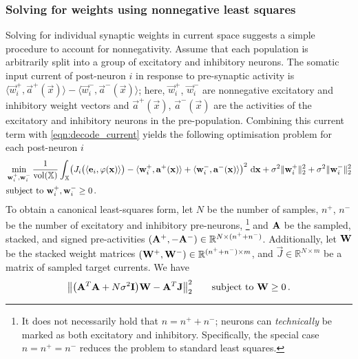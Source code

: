 \subsubsection{Solving for weights using nonnegative least squares}
Solving for individual synaptic weights in current space suggests a simple procedure to account for nonnegativity.
Assume that each population is arbitrarily split into a group of excitatory and inhibitory neurons.
The somatic input current of post-neuron $i$ in response to pre-synaptic activity is $\langle \vec w_i^+, \vec a^+(\vec x) \rangle - \langle \vec w_i^-, \vec a^-(\vec x) \rangle$;
here, $\vec w_i^+$, $\vec w_i^-$ are nonnegative excitatory and inhibitory weight vectors and $\vec a^+(\vec x)$, $\vec a^-(\vec x)$ are the activities of the excitatory and inhibitory neurons in the pre-population.
Combining this current term with \cref{eqn:decode_current} yields the following optimisation problem for each post-neuron $i$
\begin{align}
	\begin{aligned}
	& \min_{{\mathbf{w}}_i^+, {\mathbf{w}}_i^-}
	\frac{1}{\operatorname{vol}(\mathbb{X})} \int_{\mathbb{X}} \!
	\left(
		J_i\bigl(\langle \mathbf{e}_i, \varphi(\mathbf{x}) \rangle\bigr)
		- \langle \mathbf{w}_{i}^+, \mathbf{a}^+(\mathbf{x}) \rangle
		+ \langle \mathbf{w}_{i}^-, \mathbf{a}^-(\mathbf{x}) \rangle
	\right)^2 \, \mathrm{d} \mathbf{x} + \sigma^2 \|\mathbf{w}_{i}^+\|_2^2 + \sigma^2 \|\mathbf{w}_{i}^-\|_2^2 \\
	& \text{subject to } \mathbf{w}_i^+, \mathbf{w}_i^- \geq 0 \,.
	\end{aligned}
	\label{eqn:decode_nonneg}
\end{align}
To obtain a canonical least-squares form, let $N$ be the number of samples, $n^+$, $n^-$ be the number of excitatory and inhibitory pre-neurons,%
\footnote{
It does not necessarily hold that $n = n^+ + n^-$; neurons can \emph{technically} be marked as both excitatory and inhibitory. Specifically, the special case $n = n^+ = n^-$ reduces the \NNLS problem to standard least squares.
}
and $\mathbf{A}$ be the sampled, stacked, and signed pre-activities $(\mathbf{A}^+, -\mathbf{A}^-) \in \mathbb{R}^{N \times (n^+ + n^-)}$.
Additionally, let $\mathbf{W}$ be the stacked weight matrices $(\mathbf{W}^+, \mathbf{W}^-) \in \mathbb{R}^{(n^+ + n^-) \times m}$, and $\vec J \in \mathbb{R}^{N \times m}$ be a matrix of sampled target currents. We have
\begin{align}
	\bigl\| \bigl( \mathbf{A}^T \mathbf{A} + N \sigma^2 \mathbf{I} \bigr) \mathbf{W} - \mathbf{A}^T \mathbf{J} \bigr\|_2^2 \quad\quad \text{subject to } \mathbf{W} \geq 0 \,.
	\label{eqn:decode_nonneg_canon}
\end{align}
